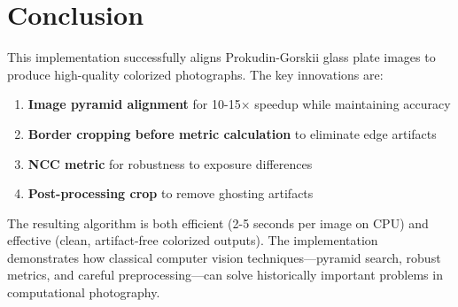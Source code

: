 \documentclass[11pt]{article}
\begin{document}
\section{Conclusion}

This implementation successfully aligns Prokudin-Gorskii glass plate images to produce high-quality colorized photographs. The key innovations are:

\begin{enumerate}
\item \textbf{Image pyramid alignment} for 10-15$\times$ speedup while maintaining accuracy
\item \textbf{Border cropping before metric calculation} to eliminate edge artifacts
\item \textbf{NCC metric} for robustness to exposure differences
\item \textbf{Post-processing crop} to remove ghosting artifacts
\end{enumerate}

The resulting algorithm is both efficient (2-5 seconds per image on CPU) and effective (clean, artifact-free colorized outputs). The implementation demonstrates how classical computer vision techniques—pyramid search, robust metrics, and careful preprocessing—can solve historically important problems in computational photography.
\end{document}
